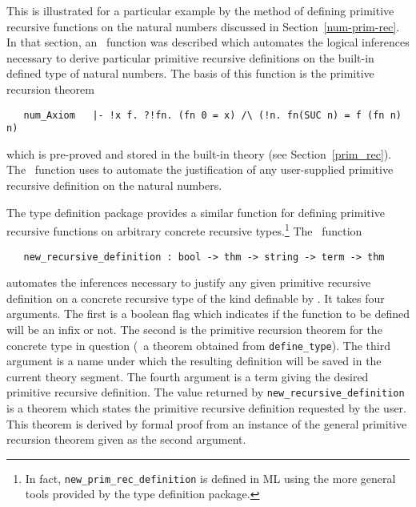 {{This is illustrated
for a particular
example by the method of defining primitive recursive functions on
the natural numbers  discussed in Section~\ref{num-prim-rec}.  In that section,
an \ML\ function 
 was described which automates
the logical inferences necessary to derive particular primitive recursive
definitions on the built-in defined type  of natural numbers.  The
basis of this function is the primitive recursion theorem

\begin{hol}
\begin{verbatim}
   num_Axiom   |- !x f. ?!fn. (fn 0 = x) /\ (!n. fn(SUC n) = f (fn n) n)
\end{verbatim}\end{hol}

\noindent which is pre-proved and stored in the built-in theory 
(see Section~\ref{prim_rec}).  The \ML\ function
 uses  to automate the
justification of any user-supplied primitive recursive definition on the
natural numbers.

The type definition package provides a similar function for defining 
primitive recursive functions on
arbitrary concrete recursive
types.\footnote{In fact, {\tt new\_prim\_rec\_definition} is defined in ML
using the more general tools provided by the type definition package.}
The \ML\ function

\begin{boxed}
\begin{verbatim}
   new_recursive_definition : bool -> thm -> string -> term -> thm
\end{verbatim}\end{boxed}

\noindent automates the
inferences necessary to justify any given primitive recursive definition on a
concrete recursive type of the kind definable by .
 It takes four arguments.  The first is a boolean
flag which indicates if the function to be defined will be an infix or not.  
The second is the primitive recursion theorem for the concrete type in question
(\ie\ a theorem obtained from {\small\verb!define_type!}).  The third
argument is a name under which the resulting definition will be saved in the
current theory segment.
The fourth argument is a term giving the desired primitive recursive
definition.  The value returned
by  {\small\verb!new_recursive_definition!} is a theorem
which states the primitive recursive definition requested by the
user.  This theorem is derived by formal proof from an instance of the general
primitive recursion theorem
 given as the second argument.

}}
